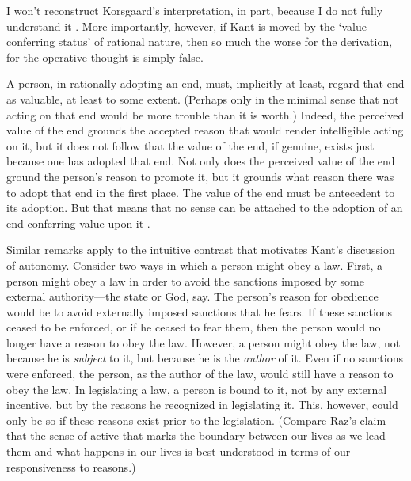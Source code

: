 \documentclass[a4paper,12pt]{article}
\begin{document}
I won't reconstruct Korsgaard's interpretation, in part, because I do not fully understand it \citep[though, for an elaboration, see][]{Wood:1999zy}. More importantly, however, if Kant is moved by the `value-conferring status' of rational nature, then so much the worse for the derivation, for the operative thought is simply false.

A person, in rationally adopting an end, must, implicitly at least, regard that end as valuable, at least to some extent. (Perhaps only in the minimal sense that not acting on that end would be more trouble than it is worth.) Indeed, the perceived value of the end grounds the accepted reason that would render intelligible acting on it, but it does not follow that the value of the end, if genuine, exists just because one has adopted that end. Not only does the perceived value of the end ground the person's reason to promote it, but it grounds what reason there was to adopt that end in the first place. The value of the end must be antecedent to its adoption. But that means that no sense can be attached to the adoption of an end conferring value upon it \citep[see][]{Scanlon:2004ac}.

Similar remarks apply to the intuitive contrast that motivates Kant's discussion of autonomy. Consider two ways in which a person might obey a law. First, a person might obey a law in order to avoid the sanctions imposed by some external authority---the state or God, say. The person's reason for obedience would be to avoid externally imposed sanctions that he fears. If these sanctions ceased to be enforced, or if he ceased to fear them, then the person would no longer have a reason to obey the law. However, a person might obey the law, not because he is {\itshape subject} to it, but because he is the {\itshape author} of it. Even if no sanctions were enforced, the person, as the author of the law, would still have a reason to obey the law. In legislating a law, a person is bound to it, not by any external incentive, but by the reasons he recognized in legislating it. This, however, could only be so if these reasons exist prior to the legislation. (Compare Raz's \citeyear{Raz:2001kx} claim that the sense of active that marks the boundary between our lives as we lead them and what happens in our lives is best understood in terms of our responsiveness to reasons.)
\end{document}
